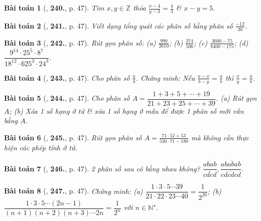\documentclass{article}
\numberwithin{equation}{section}
\newtheorem{baitoan}{Bài toán}
\begin{document}
\begin{baitoan}[\cite{Tuyen_Toan_6}, \textbf{240.}, p. 47]
	Tìm $x,y\in\mathbb{Z}$ thỏa $\frac{x - 4}{y - 3} = \frac{4}{3}$ \& $x - y = 5$.
\end{baitoan}

\begin{baitoan}[\cite{Tuyen_Toan_6}, \textbf{241.}, p. 47]
	Viết dạng tổng quát các phân số bằng phân số $\frac{-12}{30}$.
\end{baitoan}

\begin{baitoan}[\cite{Tuyen_Toan_6}, \textbf{242.}, p. 47]
	Rút gọn phân số: (a) $\frac{990}{2610}$; (b) $\frac{374}{506}$; (c) $\frac{3600 - 75}{8400 - 175}$; (d) $\dfrac{9^{14}\cdot25^5\cdot8^7}{18^{12}\cdot625^3\cdot24^3}$.
\end{baitoan}

\begin{baitoan}[\cite{Tuyen_Toan_6}, \textbf{243.}, p. 47]
	Cho phân số $\frac{a}{b}$. Chứng minh: Nếu $\frac{a - x}{b - y} = \frac{a}{b}$ thì $\frac{x}{y} = \frac{a}{b}$.
\end{baitoan}

\begin{baitoan}[\cite{Tuyen_Toan_6}, \textbf{244.}, p. 47]
	Cho phân số $A = \dfrac{1 + 3 + 5 + \cdots + 19}{21 + 23 + 25 + \cdots + 39}$. (a) Rút gọn $A$; (b) Xóa 1 số hạng ở tử \& xóa 1 số hạng ở mẫu để được 1 phân số mới vẫn bằng $A$.
\end{baitoan}

\begin{baitoan}[\cite{Tuyen_Toan_6}, \textbf{245.}, p. 47]
	Rút gọn phân số $A = \frac{71\cdot52 + 53}{530\cdot71 - 180}$ mà không cần thực hiện các phép tính ở tử.
\end{baitoan}

\begin{baitoan}[\cite{Tuyen_Toan_6}, \textbf{246.}, p. 47]
	2 phân số sau có bằng nhau không? $\dfrac{\overline{abab}}{\overline{cdcd}},\dfrac{\overline{ababab}}{\overline{cdcdcd}}$.
\end{baitoan}

\begin{baitoan}[\cite{Tuyen_Toan_6}, \textbf{247.}, p. 47]
	Chứng minh: (a) $\dfrac{1\cdot3\cdot5\cdots39}{21\cdot22\cdot23\cdots40} = \dfrac{1}{2^{20}}$; (b) $\dfrac{1\cdot3\cdot5\cdots(2n - 1)}{(n + 1)(n + 2)(n + 3)\cdots2n} = \dfrac{1}{2^n}$ với $n\in\mathbb{N}^\star$.
\end{baitoan}
\end{document}
